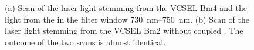 	\begin{figure}[tp]
		\begin{subfigure}[t]{ 0.49\linewidth}
			\centering
			\caption{}
			\label{subfig::vcsel_excitation_with_diamond}
		\end{subfigure}
		\hfill
		\begin{subfigure}[t]{ 0.49\linewidth}
			\centering
			\caption{}
			\label{subfig::vcsel_excitation_without_diamond}
		\end{subfigure}
		\caption{(a) Scan of the laser light stemming from the VCSEL Bm4 and the \fl light from the \siv in the filter window \SIrange{730}{750}{nm}. (b) Scan of the laser light stemming from the VCSEL Bm2 without coupled \siv. The outcome of the two scans is almost identical.}
		\label{fig::vcsel_excitation}
	\end{figure}

